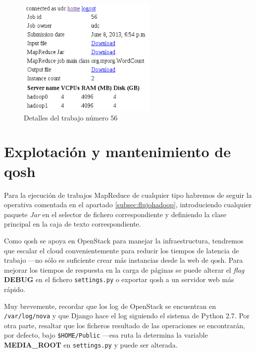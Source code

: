 \begin{figure}[tbp]
\begin{center}
\includegraphics[width=0.60\textwidth]{imagenes/048.png}
\caption{Detalles del trabajo n\'umero 56}
\label{fig:mapredjobdetails}
\end{center}
\end{figure}


\section{Explotaci\'on y mantenimiento de qosh}\label{sec:explotacionqosh}
\noindent Para la ejecuci\'on de trabajos MapReduce de cualquier tipo habremos de seguir la operativa comentada en el apartado \ref{subsec:flujohadoop}, introduciendo cualquier paquete \emph{Jar} en el selector de fichero correspondiente y definiendo la clase principal en la caja de texto correspondiente. \newline

Como qosh se apoya en OpenStack para manejar la infraestructura, tendremos que escalar el cloud convenientemente para reducir los tiempos de latencia de trabajo ---no s\'olo es suficiente crear m\'as instancias desde la web de qosh. Para mejorar los tiempos de respuesta en la carga de p\'aginas se puede alterar el \emph{flag} \textbf{DEBUG} en el fichero \texttt{settings.py} o exportar qosh a un servidor web m\'as r\'apido. \newline

Muy brevemente, recordar que los log de OpenStack se encuentran en \texttt{/var/log/nova} y que Django hace el log siguiendo el sistema de Python 2.7. Por otra parte, resaltar que los ficheros resultado de las operaciones se encontrar\'an, por defecto, bajo \texttt{\$HOME/Public} ---esa ruta la determina la variable \textbf{MEDIA\_ROOT} en \texttt{settings.py} y puede ser alterada.




